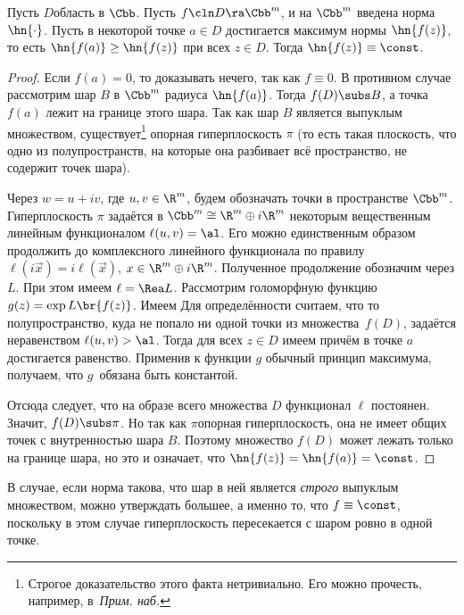 \documentclass[a4paper]{article}
\begin{document}
\begin{lemma}
Пусть $D$\т область в $\Cbb$. Пусть $f\cln D \ra \Cbb^m$, и на $\Cbb^m$ введена норма $\hn{\cdot}$.
Пусть в некоторой точке $a \in D$ достигается максимум нормы $\hn{f(z)}$, то
есть $\hn{f(a)} \ge \hn{f(z)}$ при всех $z \in D$. Тогда $\hn{f(z)} \equiv \const$.
\end{lemma}
\begin{proof}
Если $f(a) = 0$, то доказывать нечего, так как $f \equiv 0$. В противном случае
рассмотрим шар $B$ в $\Cbb^m$ радиуса $\hn{f(a)}$. Тогда $f(D) \subs B$,
а точка $f(a)$ лежит на границе этого шара.
Так как шар $B$ является выпуклым множеством, существует\footnote{Строгое доказательство
этого факта нетривиально. Его можно прочесть, например,
в~\cite[гл.\,7,~\S\,2,~теорема\,1]{vinberg}\т \emph{Прим. наб.}} опорная
гиперплоскость $\pi$ (то есть такая плоскость, что одно из полупространств,
на которые она разбивает всё пространство, не содержит точек шара).

Через $w = u + i v$, где $u,v \in \R^m$, будем обозначать точки в пространстве $\Cbb^m$.
Гиперплоскость $\pi$ задаётся в $\Cbb^m \cong \R^m \oplus i\R^m$ некоторым вещественным
линейным функционалом $\ell(u,v) = \al$. Его можно единственным образом продолжить до
комплексного линейного функционала по правилу
$\ell(i \vec x) = i\ell(\vec x)$, $x \in \R^m\oplus i\R^m$. Полученное продолжение
обозначим через $L$. При этом имеем $\ell = \Rea L$. Рассмотрим голоморфную
функцию $g(z) = \exp L\br{f(z)}$. Имеем
Для определённости считаем, что то полупространство, куда не попало ни одной точки из
множества~$f(D)$,
задаётся неравенством $\ell(u,v) > \al$. Тогда для всех $z \in D$ имеем
причём в точке $a$ достигается равенство. Применив к функции $g$ обычный принцип максимума,
получаем, что $g$~обязана быть константой.

Отсюда следует, что на образе всего множества $D$ функционал $\ell$ постоянен. Значит,
$f(D) \subs \pi$. Но так как $\pi$\т опорная гиперплоскость, она
не имеет общих точек с внутренностью шара $B$. Поэтому множество $f(D)$ может лежать только
на границе шара, но это и означает, что $\hn{f(z)}=\hn{f(a)} = \const$.
\end{proof}

\begin{note}
В случае, если норма такова, что шар в ней является \emph{строго} выпуклым множеством,
можно утверждать большее, а именно то, что $f \equiv \const$, поскольку в этом случае
гиперплоскость пересекается с шаром ровно в одной точке.
\end{note}
\end{document}
